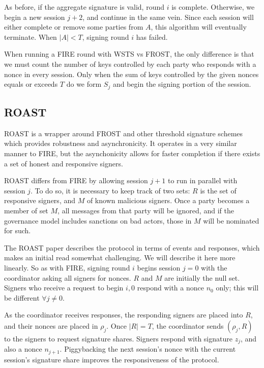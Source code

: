 \documentclass{article}
\theoremstyle{plain}
\theoremstyle{definition}
\theoremstyle{remark}
\begin{document}
As before, if the aggregate signature is valid, round $i$ is complete.  Otherwise, we begin a new session $j+2$, and continue in the same vein.  Since each session will either complete or remove some parties from $A$, this algorithm will eventually terminate.  When $|A| < T$, signing round $i$ has failed.

When running a FIRE round with WSTS vs FROST, the only difference is that we must count the number of keys controlled by each party who responds with a nonce in every session.  Only when the sum of keys controlled by the given nonces equals or exceeds $T$ do we form $S_j$ and begin the signing portion of the session.  


\subsection{
  ROAST
}

ROAST\cite{roast} is a wrapper around FROST and other threshold signature schemes which provides robustness and asynchronicity.  It operates in a very similar manner to FIRE, but the asynchonicity allows for faster completion if there exists a set of honest and responsive signers.

ROAST differs from FIRE by allowing session $j+1$ to run in parallel with session $j$.  To do so, it is necessary to keep track of two sets: $R$ is the set of responsive signers, and $M$ of known malicious signers.  Once a party becomes a member of set $M$, all messages from that party will be ignored, and if the governance model includes sanctions on bad actors, those in $M$ will be nominated for such.

The ROAST paper describes the protocol in terms of events and responses, which makes an initial read somewhat challenging.  We will describe it here more linearly.  So as with FIRE, signing round $i$ begins session $j = 0$ with the coordinator asking all signers for nonces.  $R$ and $M$ are initially the null set.  Signers who receive a request to begin $i,0$ respond with a nonce $n_0$ only; this will be different $\forall j \neq 0$.

As the coordinator receives responses, the responding signers are placed into $R$, and their nonces are placed in $\rho_j$.  Once $|R| = T$, the coordinator sends $(\rho_j, R)$ to the signers to request signature shares.  Signers respond with signature $z_j$, and also a nonce $n_{j+1}$.  Piggybacking the next session's nonce with the current session's signature share improves the responsiveness of the protocol.
\end{document}
